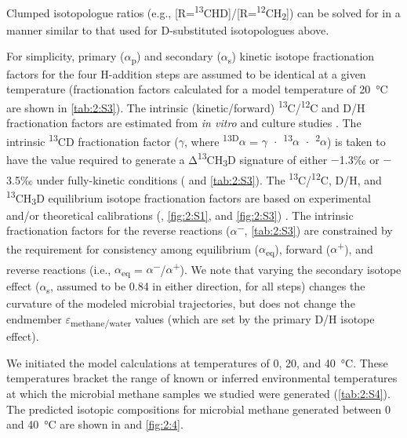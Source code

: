 Clumped isotopologue ratios (e.g.,
{[}R=\textsuperscript{13}CHD{]}/{[}R=\textsuperscript{12}CH\textsubscript{2}{]})
can be solved for in a manner similar to that used for D-substituted
isotopologues above.

For simplicity, primary ($\alpha$\textsubscript{p}) and secondary
($\alpha$\textsubscript{s}) kinetic isotope fractionation factors for the four
H-addition steps are assumed to be identical at a given temperature
(fractionation factors calculated for a model temperature of 20~°C are
shown in \autoref{tab:2:S3}). The intrinsic (kinetic/forward)
\textsuperscript{13}C/\textsuperscript{12}C and D/H fractionation
factors are estimated from \emph{in vitro} and culture studies \parencite{Valentine++_2004_GCA,Hermes++_1984_Bc,Roston+Kohen_2010_PNAS,Scharschmidt++_1984_Bc,Scheller++_2013_JACS_KIE}. The intrinsic \textsuperscript{13}CD
fractionation factor ($\gamma$, where \textsuperscript{13D}$\alpha$ = $\gamma$ ·
\textsuperscript{13}$\alpha$ · \textsuperscript{2}$\alpha$) is taken to have the value
required to generate a Δ\textsuperscript{13}CH\textsubscript{3}D
signature of either $-$1.3‰ or $-$3.5‰ under fully-kinetic conditions ( and \autoref{tab:2:S3}). The \textsuperscript{13}C/\textsuperscript{12}C,
D/H, and \textsuperscript{13}CH\textsubscript{3}D equilibrium isotope
fractionation factors are based on experimental and/or theoretical
calibrations (, \ref{fig:2:S1}, and \ref{fig:2:S3}) \parencite{Ono++_2014_AC,Horibe+Craig_1995_GCA,Cerrai++_1954,Horita_2001_GCA}. The intrinsic fractionation factors for the
reverse reactions ($\alpha$\textsuperscript{$-$}, \autoref{tab:2:S3}) are constrained by
the requirement for consistency among equilibrium ($\alpha$\textsubscript{eq}),
forward ($\alpha$\textsuperscript{+}), and reverse reactions (i.e.,
$\alpha$\textsubscript{eq} = $\alpha$\textsuperscript{$-$}/$\alpha$\textsuperscript{+}). We
note that varying the secondary isotope effect ($\alpha$\textsubscript{s},
assumed to be 0.84 in either direction, for all steps) changes the
curvature of the modeled microbial trajectories, but does not change the
endmember $\varepsilon$\textsubscript{methane/water} values (which are set by the
primary D/H isotope effect).

We initiated the model calculations at temperatures of 0, 20, and 40~°C.
These temperatures bracket the range of known or inferred environmental
temperatures at which the microbial methane samples we studied were
generated (\autoref{tab:2:S4}). The predicted isotopic compositions for microbial
methane generated between 0 and 40~°C are shown in  and \ref{fig:2:4}.

